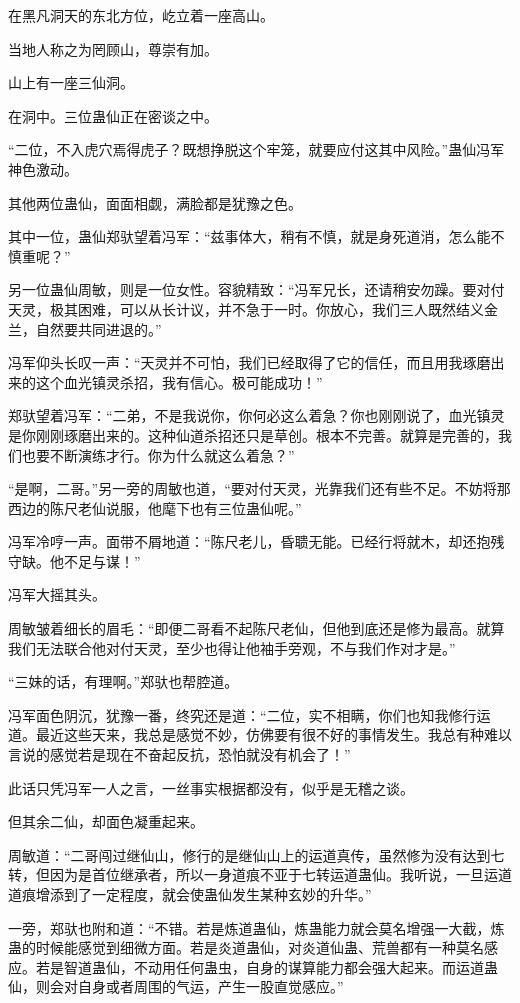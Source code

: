\begin{this_body}
在黑凡洞天的东北方位，屹立着一座高山。

当地人称之为罔顾山，尊崇有加。

山上有一座三仙洞。

在洞中。三位蛊仙正在密谈之中。

“二位，不入虎穴焉得虎子？既想挣脱这个牢笼，就要应付这其中风险。”蛊仙冯军神色激动。

其他两位蛊仙，面面相觑，满脸都是犹豫之色。

其中一位，蛊仙郑驮望着冯军：“兹事体大，稍有不慎，就是身死道消，怎么能不慎重呢？”

另一位蛊仙周敏，则是一位女性。容貌精致：“冯军兄长，还请稍安勿躁。要对付天灵，极其困难，可以从长计议，并不急于一时。你放心，我们三人既然结义金兰，自然要共同进退的。”

冯军仰头长叹一声：“天灵并不可怕，我们已经取得了它的信任，而且用我琢磨出来的这个血光镇灵杀招，我有信心。极可能成功！”

郑驮望着冯军：“二弟，不是我说你，你何必这么着急？你也刚刚说了，血光镇灵是你刚刚琢磨出来的。这种仙道杀招还只是草创。根本不完善。就算是完善的，我们也要不断演练才行。你为什么就这么着急？”

“是啊，二哥。”另一旁的周敏也道，“要对付天灵，光靠我们还有些不足。不妨将那西边的陈尺老仙说服，他麾下也有三位蛊仙呢。”

冯军冷哼一声。面带不屑地道：“陈尺老儿，昏聩无能。已经行将就木，却还抱残守缺。他不足与谋！”

冯军大摇其头。

周敏皱着细长的眉毛：“即便二哥看不起陈尺老仙，但他到底还是修为最高。就算我们无法联合他对付天灵，至少也得让他袖手旁观，不与我们作对才是。”

“三妹的话，有理啊。”郑驮也帮腔道。

冯军面色阴沉，犹豫一番，终究还是道：“二位，实不相瞒，你们也知我修行运道。最近这些天来，我总是感觉不妙，仿佛要有很不好的事情发生。我总有种难以言说的感觉若是现在不奋起反抗，恐怕就没有机会了！”

此话只凭冯军一人之言，一丝事实根据都没有，似乎是无稽之谈。

但其余二仙，却面色凝重起来。

周敏道：“二哥闯过继仙山，修行的是继仙山上的运道真传，虽然修为没有达到七转，但因为是首位继承者，所以一身道痕不亚于七转运道蛊仙。我听说，一旦运道道痕增添到了一定程度，就会使蛊仙发生某种玄妙的升华。”

一旁，郑驮也附和道：“不错。若是炼道蛊仙，炼蛊能力就会莫名增强一大截，炼蛊的时候能感觉到细微方面。若是炎道蛊仙，对炎道仙蛊、荒兽都有一种莫名感应。若是智道蛊仙，不动用任何蛊虫，自身的谋算能力都会强大起来。而运道蛊仙，则会对自身或者周围的气运，产生一股直觉感应。”


\end{this_body}

